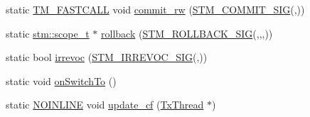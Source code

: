 \begin{DoxyCompactItemize}
static \hyperlink{platform_8hpp_a8b5d728e6eed8f368f9966f637d2f719}{T\-M\-\_\-\-F\-A\-S\-T\-C\-A\-L\-L} void \hyperlink{structanonymous__namespace_02ringala_8cpp_03_1_1RingALA_a7aa13b845472a01d386d75e2275eacee}{commit\-\_\-rw} (\hyperlink{include_2stm_2macros_8hpp_a1b8304eb1082517c7dc31f3534b72343}{S\-T\-M\-\_\-\-C\-O\-M\-M\-I\-T\-\_\-\-S\-I\-G}(,))
\item 
static \hyperlink{namespacestm_a91badf88c88aacc831b01a315435a255}{stm\-::scope\-\_\-t} $\ast$ \hyperlink{structanonymous__namespace_02ringala_8cpp_03_1_1RingALA_a851d83de683577f092271a2af9302a0b}{rollback} (\hyperlink{include_2stm_2macros_8hpp_a1c36a48149c84f90d5bca01019950ca9}{S\-T\-M\-\_\-\-R\-O\-L\-L\-B\-A\-C\-K\-\_\-\-S\-I\-G}(,,,))
\item 
static bool \hyperlink{structanonymous__namespace_02ringala_8cpp_03_1_1RingALA_adf0c85a0156c449312444100bdba7200}{irrevoc} (\hyperlink{include_2stm_2macros_8hpp_acf117c2df6442342f6603e1a12fa3b5c}{S\-T\-M\-\_\-\-I\-R\-R\-E\-V\-O\-C\-\_\-\-S\-I\-G}(,))
\item 
static void \hyperlink{structanonymous__namespace_02ringala_8cpp_03_1_1RingALA_aba18d91681c530358115267fe58e442b}{on\-Switch\-To} ()
\item 
static \hyperlink{platform_8hpp_a1b173d22e57d9395897acbd8de62d505}{N\-O\-I\-N\-L\-I\-N\-E} void \hyperlink{structanonymous__namespace_02ringala_8cpp_03_1_1RingALA_adb689fb63b4c68957f92576b8638142f}{update\-\_\-cf} (\hyperlink{structstm_1_1TxThread}{Tx\-Thread} $\ast$)
\end{DoxyCompactItemize}


